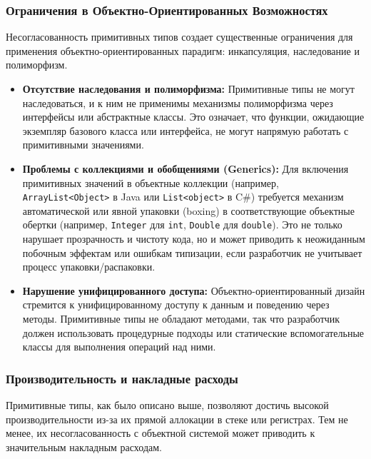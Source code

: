 \subsubsection*{Ограничения в Объектно-Ориентированных Возможностях}
Несогласованность примитивных типов создает существенные ограничения для применения объектно-ориентированных парадигм: инкапсуляция, наследование и полиморфизм.

\begin{itemize}
    \item \textbf{Отсутствие наследования и полиморфизма:} Примитивные типы не могут наследоваться, и к ним не применимы механизмы полиморфизма через интерфейсы или абстрактные классы. Это означает, что функции, ожидающие экземпляр базового класса или интерфейса, не могут напрямую работать с примитивными значениями.

    \item \textbf{Проблемы с коллекциями и обобщениями (Generics):} Для включения примитивных значений в объектные коллекции (например, \texttt{ArrayList<Object>} в Java или \texttt{List<object>} в C\#) требуется механизм автоматической или явной упаковки (boxing) в соответствующие объектные обертки (например, \texttt{Integer} для \texttt{int}, \texttt{Double} для \texttt{double}). Это не только нарушает прозрачность и чистоту кода, но и может приводить к неожиданным побочным эффектам или ошибкам типизации, если разработчик не учитывает процесс упаковки/распаковки.

    \item \textbf{Нарушение унифицированного доступа:} Объектно-ориентированный дизайн стремится к унифицированному доступу к данным и поведению через методы. Примитивные типы не обладают методами, так что разработчик должен использовать процедурные подходы или статические вспомогательные классы для выполнения операций над ними.
\end{itemize}

\subsubsection*{Производительность и накладные расходы}
\label{sec:performance}

Примитивные типы, как было описано выше, позволяют достичь высокой производительности из-за их прямой аллокации в стеке или регистрах. Тем не менее, их несогласованность с объектной системой может приводить к значительным накладным расходам.

